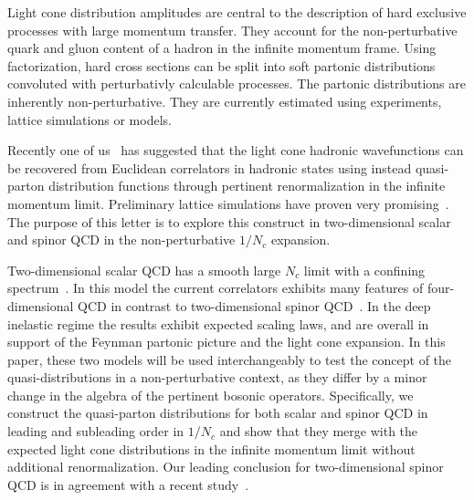\documentclass[showpacs,twocolumn,aps,preprintnumbers,letterpaper]{revtex4}
\begin{document}
Light cone distribution amplitudes are central to the description of hard exclusive processes
with large momentum transfer. They account for the non-perturbative quark and gluon content 
of a hadron in the infinite momentum frame. Using factorization, hard cross sections can be 
split into soft partonic distributions convoluted with perturbativly calculable processes. The
partonic distributions are inherently non-perturbative. They are currently estimated using 
experiments, lattice simulations or models. 

Recently one of us~\cite{JI1} has suggested that the light cone hadronic wavefunctions 
can be recovered from Euclidean correlators in hadronic states using instead 
quasi-parton distribution functions  through pertinent renormalization in the infinite momentum limit. 
Preliminary lattice simulations have proven very promising~\cite{JI2,ALEX}. The purpose of this
letter is to explore this construct in two-dimensional scalar and spinor QCD in the non-perturbative $1/N_c$
expansion.

Two-dimensional scalar QCD has a smooth large $N_c$ limit with a confining spectrum~\cite{TSAO,TAM,GRIN}. In this
model the current correlators exhibits many features of four-dimensional QCD in contrast to two-dimensional spinor QCD~\cite{HOOFT}. 
In the deep inelastic  regime  the results exhibit expected scaling laws, and are overall in support of the Feynman partonic picture
and the light cone expansion. 
In this paper, these two models will be used interchangeably to test the concept of the
quasi-distributions in a non-perturbative context, as they differ by a minor change in the algebra of the pertinent bosonic operators. 
Specifically, we  construct the quasi-parton distributions for both scalar and spinor QCD in leading and subleading order in $1/N_c$ and show that they merge with the expected light cone distributions
in the infinite momentum limit without additional renormalization. Our leading conclusion for two-dimensional spinor QCD is in agreement
with a recent study~\cite{RECENT}. 
\end{document}
